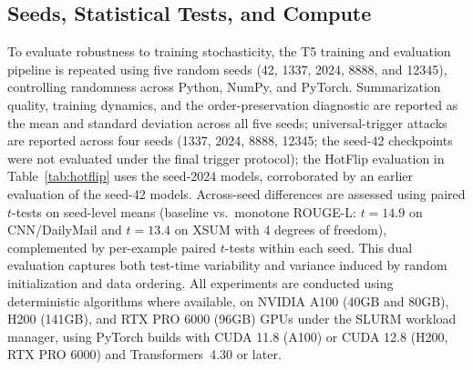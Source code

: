 \documentclass{article}
\theoremstyle{plain}
\theoremstyle{definition}
\theoremstyle{remark}
\theoremstyle{plain}
\begin{document}
\subsection{Seeds, Statistical Tests, and Compute}
\label{app:seeds}
To evaluate robustness to training stochasticity, the T5 training and evaluation pipeline is repeated using five random seeds (42, 1337, 2024, 8888, and 12345), controlling randomness across Python, NumPy, and PyTorch. Summarization quality, training dynamics, and the order-preservation diagnostic are reported as the mean and standard deviation across all five seeds; universal-trigger attacks are reported across four seeds (1337, 2024, 8888, 12345; the seed-42 checkpoints were not evaluated under the final trigger protocol); the HotFlip evaluation in Table~\ref{tab:hotflip} uses the seed-2024 models, corroborated by an earlier evaluation of the seed-42 models.
Across-seed differences are assessed using paired $t$-tests on seed-level means (baseline vs.\ monotone ROUGE-L: $t = 14.9$ on CNN/DailyMail and $t = 13.4$ on XSUM with 4 degrees of freedom), complemented by per-example paired $t$-tests within each seed. This dual evaluation captures both test-time variability and variance induced by random initialization and data ordering. All experiments are conducted using deterministic algorithms where available, on NVIDIA A100 (40GB and 80GB), H200 (141GB), and RTX PRO 6000 (96GB) GPUs under the SLURM workload manager, using PyTorch builds with CUDA 11.8 (A100) or CUDA 12.8 (H200, RTX PRO 6000) and Transformers~4.30 or later.
\end{document}

